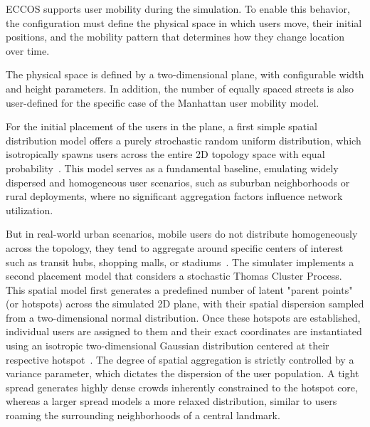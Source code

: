 \documentclass[ASNA]{USG} %
\begin{document}
ECCOS supports user mobility during the simulation. To enable this behavior, the configuration must define the physical space in which users move, their initial positions, and the mobility pattern that determines how they change location over time.

The physical space is defined by a two-dimensional plane, with configurable width and height parameters. In addition, the number of equally spaced streets is also user-defined for the specific case of the Manhattan user mobility model. 


For the initial placement of the users in the plane, a first simple spatial distribution model offers a purely strochastic random uniform distribution, which isotropically spawns users across the entire 2D topology space with equal probability~\cite{Han2022Local}. This model serves as a fundamental baseline, emulating widely dispersed and homogeneous user scenarios, such as suburban neighborhoods or rural deployments, where no significant aggregation factors influence network utilization. 

But in real-world urban scenarios, mobile users do not distribute homogeneously across the topology, they tend to aggregate around specific centers of interest such as transit hubs, shopping malls, or stadiums~\cite{Yang2021Comparative}. The simulater implements a second placement model that considers a stochastic Thomas Cluster Process. This spatial model first generates a predefined number of latent "parent points" (or hotspots) across the simulated 2D plane, with their spatial dispersion sampled from a two-dimensional normal distribution. Once these hotspots are established, individual users are assigned to them and their exact coordinates are instantiated using an isotropic two-dimensional Gaussian distribution centered at their respective hotspot~\cite{Saha2016Enriched}. The degree of spatial aggregation is strictly controlled by a variance parameter, which dictates the dispersion of the user population. A tight spread generates highly dense crowds inherently constrained to the hotspot core, whereas a larger spread models a more relaxed distribution, similar to users roaming the surrounding neighborhoods of a central landmark. 
\end{document}
